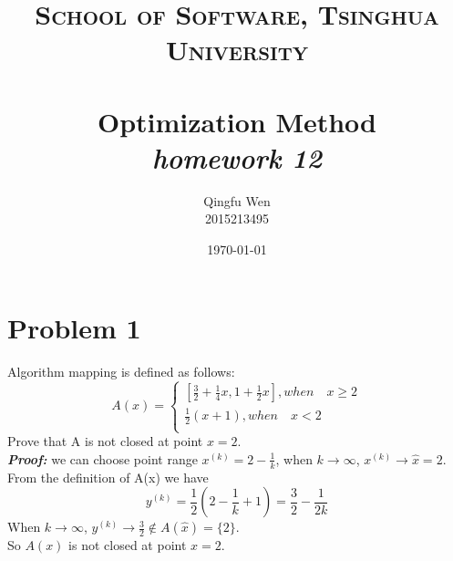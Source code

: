 \documentclass[paper=a4, fontsize=11pt]{scrartcl} %
\title{	
\normalfont \normalsize
\textsc{School of Software, Tsinghua University} \\ [25pt] %
\horrule{0.5pt} \\[0.4cm] %
\huge Optimization Method\\ %
\LARGE\textit{homework 12}
\horrule{2pt} \\[0.5cm] %
}
\author{Qingfu Wen \\ \normalsize 2015213495} %
\date{\normalsize\today} %
\numberwithin{equation}{section} %
\numberwithin{figure}{section} %
\numberwithin{table}{section} %
\begin{document}
\maketitle %
\tableofcontents
\newpage
\section{Problem 1}
Algorithm mapping is defined as follows:
\begin{equation} \nonumber
A(x)=
\left\{
\begin{aligned}
\left[\frac{3}{2}+\frac{1}{4}x,1+\frac{1}{2}x\right], when\quad x\geq2\\
\frac{1}{2}(x+1), when\quad x<2\\
\end{aligned}
\right.
\end{equation}
Prove that A is not closed at point $x=2$.
\\
\emph{\textbf{Proof:}}
we can choose point range $x^{(k)} = 2-\frac{1}{k}$, when $k\rightarrow\infty$, $x^{(k)}\rightarrow\hat{x}=2$.\\
From the definition of A(x) we have
\begin{equation} \nonumber
y^{(k)} = \frac{1}{2}(2-\frac{1}{k}+1) = \frac{3}{2}-\frac{1}{2k}
\end{equation}
When $k\rightarrow\infty$, $y^{(k)}\rightarrow\frac{3}{2}\notin A(\hat{x})=\{2\}$.\\
So $A(x)$ is not closed at point $x=2$. 
\end{document}
